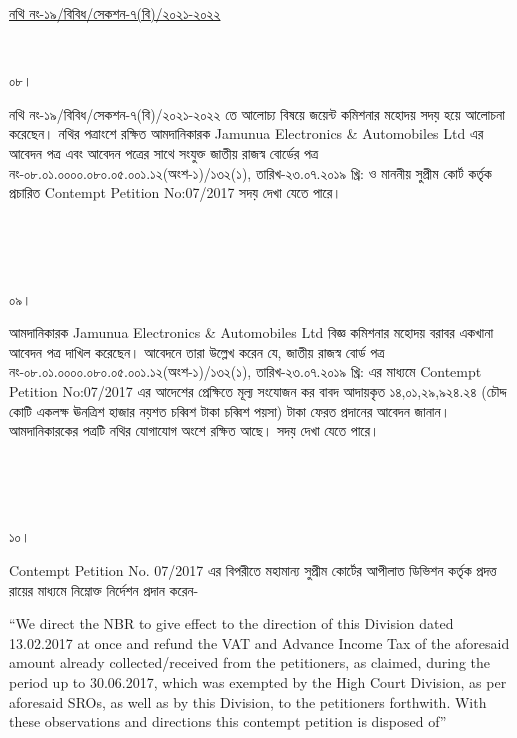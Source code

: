 \documentclass[12pt]{article}
\begin{document}
\begin{minipage}[t]{0.59\linewidth}
\hspace{0.5em}
\end{minipage}
\begin{minipage}[t]{1\textwidth}
\underline{নথি নং-১৯/বিবিধ/সেকশন-৭(বি)/২০২১-২০২২}
\end{minipage}
\\
\begin{minipage}[t]{0.05\linewidth}
০৮।
\end{minipage}
\begin{minipage}[t]{1\linewidth}
নথি নং-১৯/বিবিধ/সেকশন-৭(বি)/২০২১-২০২২
তে আলোচ্য বিষয়ে জয়েন্ট কমিশনার মহোদয়
সদয় হয়ে আলোচনা করেছেন।
নথির পত্রাংশে রক্ষিত আমদানিকারক
Jamunua Electronics \& Automobiles Ltd
এর আবেদন পত্র এবং আবেদন পত্রের সাথে সংযুক্ত
জাতীয় রাজস্ব বোর্ডের পত্র
নং-০৮.০১.০০০০.০৮০.০৫.০০১.১২(অংশ-১)/১৩২(১),
তারিখ-২৩.০৭.২০১৯ খ্রি:
ও মাননীয় সুপ্রীম কোর্ট কর্তৃক প্রচারিত
Contempt Petition No:07/2017
সদয় দেখা যেতে পারে।
\end{minipage}
\\
\\
\\
\begin{minipage}[t]{0.05\linewidth}
০৯।
\end{minipage}
\begin{minipage}[t]{1\linewidth}
আমদানিকারক
Jamunua Electronics \& Automobiles Ltd
বিজ্ঞ কমিশনার মহোদয় বরাবর
একখানা আবেদন পত্র দাখিল
করেছেন। আবেদনে তারা উল্লেখ করেন যে,
জাতীয় রাজস্ব বোর্ড পত্র
নং-০৮.০১.০০০০.০৮০.০৫.০০১.১২(অংশ-১)/১৩২(১),
তারিখ-২৩.০৭.২০১৯ খ্রি:
এর মাধ্যমে
Contempt Petition No:07/2017
এর আদেশের প্রেক্ষিতে মূল্য সংযোজন কর
বাবদ আদায়কৃত
১৪,০১,২৯,৯২৪.২৪
(চৌদ্দ কোটি একলক্ষ ঊনত্রিশ হাজার নয়শত চব্বিশ টাকা চব্বিশ পয়সা) টাকা
ফেরত প্রদানের আবেদন জানান।
আমদানিকারকের পত্রটি নথির যোগাযোগ
অংশে রক্ষিত আছে।
সদয় দেখা যেতে পারে।
\end{minipage}
\\
\\
\\
\begin{minipage}[t]{0.05\linewidth}
১০।
\end{minipage}
\begin{minipage}[t]{1\linewidth}
Contempt Petition No. 07/2017
এর বিপরীতে মহামান্য সুপ্রীম কোর্টের
আপীলাত ডিভিশন কর্তৃক প্রদত্ত রায়ের
মাধ্যমে নিম্নোক্ত নির্দেশন প্রদান করেন-


\hspace{1em}``We direct the NBR
to give effect to the direction
of this Division
dated 13.02.2017
at once and refund the VAT
and Advance Income Tax
of the aforesaid amount already
collected/received from the
petitioners, as claimed, during
the period up to 30.06.2017,
which was exempted by the
High Court Division, as per
aforesaid SROs, as well as by this
Division, to the  petitioners
forthwith. With these observations
and directions this contempt
petition is disposed of''
\end{minipage}
\end{document}
